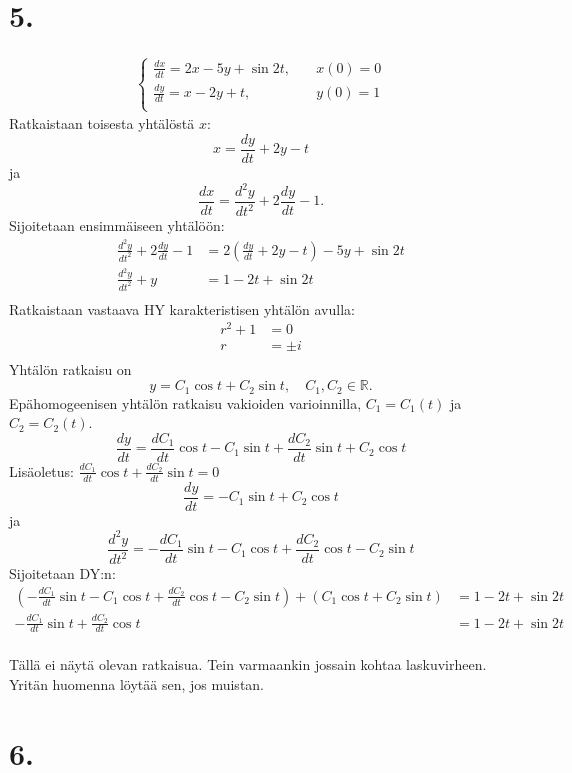 \documentclass{article}
\begin{document}
\section*{5.}

\begin{align*}
  \begin{cases}
    \frac{dx}{dt} = 2x - 5y + \sin 2t, \quad & x(0) = 0 \\
    \frac{dy}{dt} = x - 2y + t, & y(0) = 1 \\
  \end{cases}
\end{align*}
Ratkaistaan toisesta yhtälöstä $x$:
\[
  x = \frac{dy}{dt} + 2y - t
\]
ja
\[
  \frac{dx}{dt} = \frac{d^2 y}{d t^2} + 2\frac{dy}{dt} - 1.
\]
Sijoitetaan ensimmäiseen yhtälöön:
\begin{align*}
  \frac{d^2 y}{d t^2} + 2\frac{dy}{dt} - 1 &= 2(\frac{dy}{dt} + 2y - t) - 5y + \sin 2t \\
  \frac{d^2 y}{d t^2} + y &= 1 - 2t + \sin 2t \\
\end{align*}
Ratkaistaan vastaava HY karakteristisen yhtälön avulla:
\begin{align*}
  r^2 + 1 &= 0 \\
  r &= \pm i \\
\end{align*}
Yhtälön ratkaisu on
\[
  y = C_1\cos t + C_2\sin t, \quad C_1,C_2 \in \mathbb{R}.
\]
Epähomogeenisen yhtälön ratkaisu vakioiden varioinnilla,
$C_1 = C_1(t)$ ja $C_2 = C_2(t)$.
\[
  \frac{dy}{dt} = \frac{dC_1}{dt}\cos t - C_1\sin t + \frac{dC_2}{dt}\sin t + C_2\cos t
\]
Lisäoletus: $\frac{dC_1}{dt}\cos t + \frac{dC_2}{dt}\sin t = 0$
\[
  \frac{dy}{dt} = -C_1\sin t + C_2\cos t
\]
ja
\[
  \frac{d^2 y}{d t^2} = -\frac{dC_1}{dt}\sin t - C_1\cos t + \frac{dC_2}{dt}\cos t - C_2\sin t
\]
Sijoitetaan DY:n:
\begin{align*}
  (-\frac{dC_1}{dt}\sin t - C_1\cos t + \frac{dC_2}{dt}\cos t - C_2\sin t)
  + (C_1\cos t + C_2\sin t) &= 1 - 2t + \sin 2t \\
  -\frac{dC_1}{dt}\sin t + \frac{dC_2}{dt}\cos t &= 1 - 2t + \sin 2t \\
\end{align*}

Tällä ei näytä olevan ratkaisua. Tein varmaankin jossain kohtaa laskuvirheen.
Yritän huomenna löytää sen, jos muistan.

\section*{6.}
\end{document}
